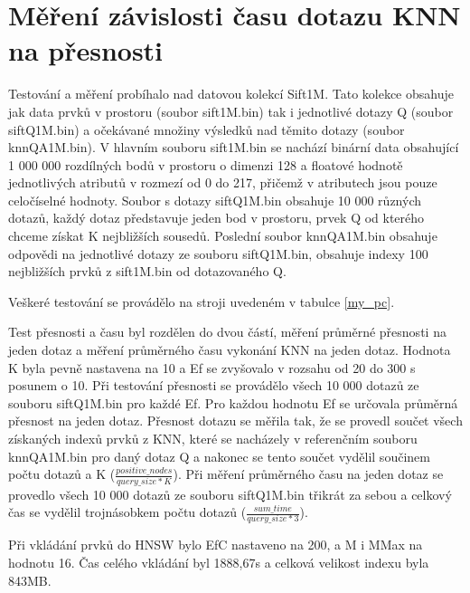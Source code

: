 \documentclass[czech,semestral,dept460,male,csharp,cpdeclaration]{diploma}
\begin{document}
		\newpage
		
		\section{Měření závislosti času dotazu KNN na přesnosti}
		
		Testování a měření probíhalo nad datovou kolekcí Sift1M. Tato kolekce obsahuje jak data prvků v prostoru (soubor sift1M.bin) tak i jednotlivé dotazy Q (soubor siftQ1M.bin) a očekávané množiny výsledků nad těmito dotazy (soubor knnQA1M.bin). V hlavním souboru sift1M.bin se nachází binární data obsahující 1 000 000 rozdílných bodů v prostoru o dimenzi 128 a floatové hodnotě jednotlivých atributů v rozmezí od 0 do 217, přičemž v atributech jsou pouze celočíselné hodnoty. Soubor s dotazy siftQ1M.bin obsahuje 10 000 různých dotazů, každý dotaz představuje jeden bod v prostoru, prvek Q od kterého chceme získat K nejbližších sousedů. Poslední soubor knnQA1M.bin obsahuje odpovědi na jednotlivé dotazy ze souboru siftQ1M.bin, obsahuje indexy 100 nejbližších prvků z sift1M.bin od dotazovaného Q.
		
		Veškeré testování se provádělo na stroji uvedeném v tabulce \ref{my_pc}.
		
		Test přesnosti a času byl rozdělen do dvou částí, měření průměrné přesnosti na jeden dotaz a měření průměrného času vykonání KNN na jeden dotaz. Hodnota K byla pevně nastavena na 10 a Ef se zvyšovalo v rozsahu od 20 do 300 s posunem o 10. Při testování přesnosti se provádělo všech 10 000 dotazů ze souboru siftQ1M.bin pro každé Ef. Pro každou hodnotu Ef se určovala průměrná přesnost na jeden dotaz. Přesnost dotazu se měřila tak, že se provedl součet všech získaných indexů prvků z KNN, které se nacházely v referenčním souboru knnQA1M.bin pro daný dotaz Q a nakonec se tento součet vydělil součinem počtu dotazů a K ($\frac{positive\_nodes}{query\_size * K}$). Při měření průměrného času na jeden dotaz se provedlo všech 10 000 dotazů ze souboru siftQ1M.bin třikrát za sebou a celkový čas se vydělil trojnásobkem počtu dotazů ($\frac{sum\_time}{query\_size * 3}$).
		
		Při vkládání prvků do HNSW bylo EfC nastaveno na 200, a M i MMax na hodnotu 16. Čas celého vkládání byl 1888,67s a celková velikost indexu byla 843MB.
		
\end{document}
